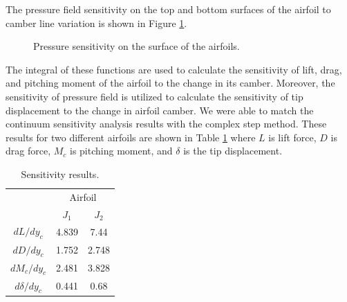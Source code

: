 \documentclass[12pt]{aiaa-pretty}
\begin{document}
The pressure field sensitivity on the top and bottom surfaces of the airfoil to camber line variation is shown in Figure \ref{fig:joukowskiChamberSensitivity}.

%
	\begin{figure}[H]
		\centering
		\quad
		\caption{Pressure sensitivity on the surface of the airfoils.}
		\label{fig:joukowskiChamberSensitivity}
	\end{figure}
%

The integral of these functions are used to calculate the sensitivity of lift, drag, and pitching moment of the airfoil to the change in its camber. Moreover, the sensitivity of pressure field is utilized to calculate the sensitivity of tip displacement to the change in airfoil camber. We were able to match the continuum sensitivity analysis results with the complex step method. These results for two different airfoils are shown in Table \ref{table:sensitivity} where $L$ is lift force, $D$ is drag force, $M_c$ is pitching moment, and $\delta$ is the tip displacement.

%
\begin{table}[H]
\centering
\begin{tabular}{c|c|c}
 & \multicolumn{2}{c}{Airfoil} \\ \cline{2-3}
 & $J_1$ & $J_2$ \\ \hline \hline
$dL/dy_c$ & 4.839 & 7.44 \\ \hline
$dD/dy_c$ & 1.752 & 2.748 \\ \hline
$dM_c/dy_c$ & 2.481 & 3.828 \\ \hline
$d\delta/dy_c$ & 0.441 & 0.68 \\ \hline
\end{tabular}
\caption{Sensitivity results.}
\label{table:sensitivity}
\end{table}
%
\end{document}
